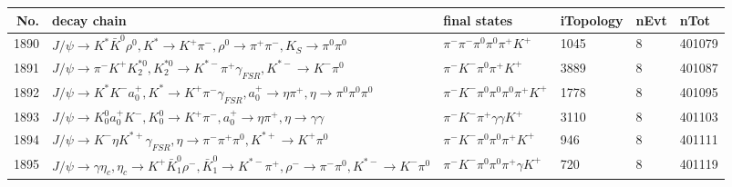 \begin{table}[htbp] 
\begin{center}
\begin{small}
\begin{tabular}{rlllll}\hline\hline
 No. & decay chain & final states &  iTopology & nEvt & nTot \\\hline
1890&$J/\psi       \rightarrow K^{*}          \bar{K}^{0}   \rho^{0}      , K^{*}           \rightarrow K^{+}          \pi^{-}        , \rho^{0}       \rightarrow \pi^{+}        \pi^{-}        , K_{S}           \rightarrow \pi^{0}        \pi^{0}        $&$\pi^{-}        \pi^{-}        \pi^{0}        \pi^{0}        \pi^{+}        K^{+}          $& 1045&    8&401079\\
1891&$J/\psi       \rightarrow \pi^{-}        K^{+}          K_2^{*0}       , K_2^{*0}        \rightarrow K^{*-}         \pi^{+}        \gamma_{FSR} , K^{*-}          \rightarrow K^{-}          \pi^{0}        $&$\pi^{-}        K^{-}          \pi^{0}        \pi^{+}        K^{+}          $& 3889&    8&401087\\
1892&$J/\psi       \rightarrow K^{*}          K^{-}          a_{0}^{+}      , K^{*}           \rightarrow K^{+}          \pi^{-}        \gamma_{FSR} , a_{0}^{+}       \rightarrow \eta          \pi^{+}        , \eta           \rightarrow \pi^{0}        \pi^{0}        \pi^{0}        $&$\pi^{-}        K^{-}          \pi^{0}        \pi^{0}        \pi^{0}        \pi^{+}        K^{+}          $& 1778&    8&401095\\
1893&$J/\psi       \rightarrow K_0^{0}        a_{0}^{+}      K^{-}          , K_0^{0}         \rightarrow K^{+}          \pi^{-}        , a_{0}^{+}       \rightarrow \eta          \pi^{+}        , \eta           \rightarrow \gamma       \gamma       $&$\pi^{-}        K^{-}          \pi^{+}        \gamma       \gamma       K^{+}          $& 3110&    8&401103\\
1894&$J/\psi       \rightarrow K^{-}          \eta          K^{*+}         \gamma_{FSR} , \eta           \rightarrow \pi^{-}        \pi^{+}        \pi^{0}        , K^{*+}          \rightarrow K^{+}          \pi^{0}        $&$\pi^{-}        K^{-}          \pi^{0}        \pi^{0}        \pi^{+}        K^{+}          $&  946&    8&401111\\
1895&$J/\psi       \rightarrow \gamma       \eta_{c}    , \eta_{c}     \rightarrow K^{+}          \bar{K}_1^{0} \rho^{-}      , \bar{K}_1^{0}  \rightarrow K^{*-}         \pi^{+}        , \rho^{-}       \rightarrow \pi^{-}        \pi^{0}        , K^{*-}          \rightarrow K^{-}          \pi^{0}        $&$\pi^{-}        K^{-}          \pi^{0}        \pi^{0}        \pi^{+}        \gamma       K^{+}          $&  720&    8&401119\\

\end{tabular}
\end{small}
\end{center}
\end{table}
